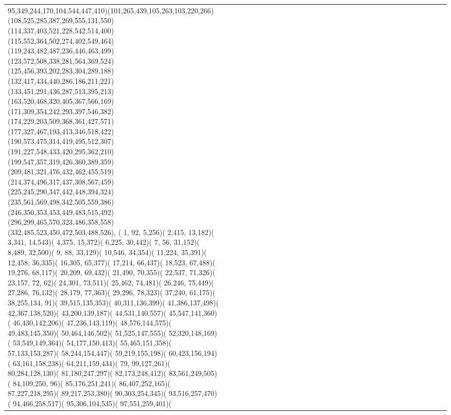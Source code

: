 \documentclass[varwidth=\maxdimen,border=10]{standalone}
\begin{document}
\begin{tabular}{@{}l@{}l@{}l@{}l@{}l@{}l@{}l@{}l@{}l@{}l@{}l@{}l@{}l@{}l@{}l@{}l@{}l@{}l@{}l@{}l@{}l@{}l@{}l@{}l@{}l@{}l@{}l@{}l@{}l@{}l@{}l@{}l@{}}
95,349,244,170,104,544,447,410)(101,265,439,105,263,103,220,266)(108,525,285,387,269,555,131,550)(114,337,403,521,228,542,514,400)(115,552,364,502,274,402,549,464)(119,243,482,487,236,446,463,499)(123,572,508,338,281,564,369,524)(125,456,393,202,283,304,289,188)(132,417,434,440,286,186,211,221)(133,451,291,436,287,513,395,213)(163,520,468,320,405,367,566,169)(171,309,354,242,293,397,546,382)(174,229,203,509,368,361,427,571)(177,327,467,193,413,346,518,422)(190,573,475,314,419,495,512,307)(191,227,548,433,420,295,362,210)(199,547,357,319,426,360,389,359)(209,481,321,476,432,462,455,519)(214,374,496,317,437,308,567,459)(225,245,290,347,442,448,394,324)(235,561,569,498,342,505,559,386)(246,350,353,453,449,483,515,492)(296,299,465,570,323,486,358,558)(332,485,523,450,472,503,488,526), (  1, 92,  5,256)(  2,415, 13,182)(  3,341, 14,543)(  4,375, 15,372)(  6,225, 30,442)(  7, 56, 31,152)(  8,489, 32,500)(  9, 88, 33,129)( 10,546, 34,354)( 11,224, 35,391)( 12,458, 36,335)( 16,305, 65,377)( 17,214, 66,437)( 18,523, 67,488)( 19,276, 68,117)( 20,209, 69,432)( 21,490, 70,355)( 22,537, 71,326)( 23,157, 72, 62)( 24,301, 73,511)( 25,462, 74,481)( 26,246, 75,449)( 27,286, 76,132)( 28,179, 77,363)( 29,296, 78,323)( 37,240, 61,175)( 38,255,134, 91)( 39,515,135,353)( 40,311,136,399)( 41,386,137,498)( 42,367,138,520)( 43,200,139,187)( 44,531,140,557)( 45,547,141,360)( 46,430,142,206)( 47,236,143,119)( 48,576,144,575)( 49,483,145,350)( 50,464,146,502)( 51,525,147,555)( 52,320,148,169)( 53,549,149,364)( 54,177,150,413)( 55,465,151,358)( 57,133,153,287)( 58,244,154,447)( 59,219,155,198)( 60,423,156,194)( 63,161,158,238)( 64,211,159,434)( 79, 99,127,261)( 80,284,128,130)( 81,180,247,297)( 82,173,248,412)( 83,561,249,505)( 84,109,250, 96)( 85,176,251,241)( 86,407,252,165)( 87,227,218,295)( 89,217,253,380)( 90,303,254,345)( 93,516,257,470)( 94,466,258,517)( 95,306,104,535)( 97,551,259,401)( 
\end{tabular}
\end{document}
